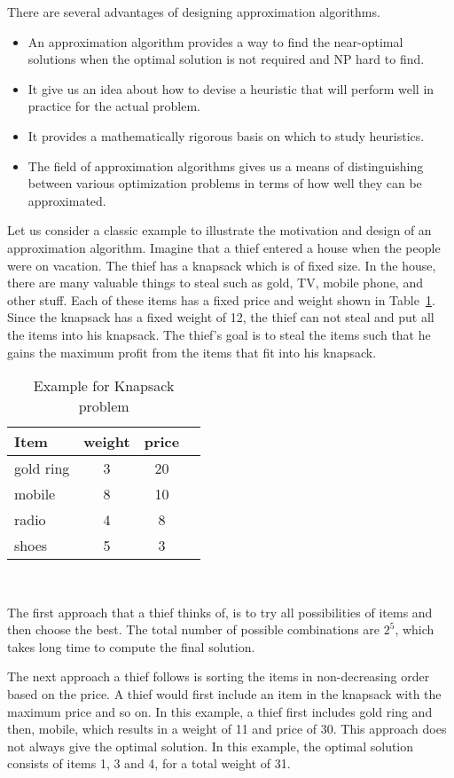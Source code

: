 There are several advantages of designing approximation algorithms.
 \begin{itemize}
  \item An approximation algorithm provides a way to find the near-optimal solutions when the optimal solution is not required and NP hard to find.
  \item It give us an idea about how to devise a heuristic that will perform well in practice for the actual problem.
  \item It provides a mathematically rigorous basis on which to study heuristics.
  \item The field of approximation algorithms gives us a means of distinguishing between various optimization problems in terms of how well they can be approximated.
 \end{itemize} 
Let us consider a classic example to illustrate the motivation and design of an approximation algorithm. 
Imagine that a thief entered a house when the people were on vacation.
The thief has a knapsack which is of fixed size. In the house, there are many valuable things to steal such as gold, TV, mobile phone, and other stuff.
Each of these items has a fixed price and weight shown in Table~\ref{table:knapsack}. 
Since the knapsack has a fixed weight of 12, the thief can not steal and put all the items into his knapsack. 
The thief's goal is to steal the items such that he gains the maximum profit from the items that fit into his knapsack. 
\begin{center}
\begin{table}
\centering
\begin{tabular}{ |l|c|c|c| } 
 \hline
 Item & weight & price \\ 
  \hline
 gold ring & 3 & 20 \\
 mobile & 8 & 10 \\
 radio & 4 & 8 \\
 shoes & 5 & 3\\
 \hline
\end{tabular}
\\[10pt]
 \caption{Example for Knapsack problem}
\label{table:knapsack}
\end{table}
\end{center}
The first approach that a thief thinks of, is to try all possibilities of items and then choose the best.
The total number of possible combinations are $2^5$, which takes long time to compute the final solution. 

The next approach a thief follows is sorting the items in non-decreasing order based on the price.
A thief would first include an item in the knapsack with the maximum price and so on.
In this example, a thief first includes gold ring and then, mobile, which results in a weight of 11 and price of 30.
This approach does not always give the optimal solution. In this example, the optimal solution consists of items 1, 3 and 4, for a total weight of 31.

